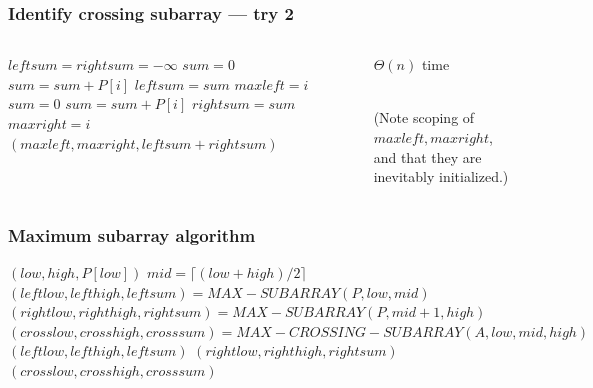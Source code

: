 \documentclass{beamer}
\newcommand{\stanza}{ \\~\ }
\begin{document}
\begin{frame} \frametitle{Identify crossing subarray --- try 2}
\begin{columns}
\begin{column}{0.6\textwidth}
  {\tiny
  \begin{algorithmic}[1]
    \State $leftsum = rightsum = -\infty$
    \State $sum = 0$
      \State $sum = sum + P[i]$
        \State $leftsum = sum$
        \State $maxleft = i$
      \EndIf
    \EndFor
    \State $sum = 0$
      \State $sum = sum + P[i]$
        \State $rightsum = sum$
        \State $maxright = i$
      \EndIf
    \EndFor
    \State \Return $(maxleft, maxright, leftsum + rightsum)$
    \EndFunction
  \end{algorithmic}
  }
\end{column}
\begin{column}{0.4\textwidth}
  $\Theta(n)$ time \stanza

  (Note scoping of $maxleft, maxright$, and that they are inevitably initialized.)
\end{column}
\end{columns}
\end{frame}

\begin{frame} \frametitle{Maximum subarray algorithm}
  {\tiny
  \begin{algorithmic}[1]
      \State \Return $(low, high, P[low])$
    \Else
      \State $mid = \lceil (low+high)/2 \rceil$
      \State $(leftlow, lefthigh, leftsum) = MAX-SUBARRAY(P, low, mid)$
      \State $(rightlow, righthigh, rightsum) = MAX-SUBARRAY(P, mid+1, high)$
      \State $(crosslow, crosshigh, crosssum) = MAX-CROSSING-SUBARRAY(A, low, mid, high)$
        \State \Return $(leftlow, lefthigh, leftsum)$ 
        \State \Return $(rightlow, righthigh, rightsum)$ 
      \Else
        \State \Return $(crosslow, crosshigh, crosssum)$ 
      \EndIf
    \EndIf
    \EndFunction
  \end{algorithmic}
  }
\end{frame}
\end{document}
